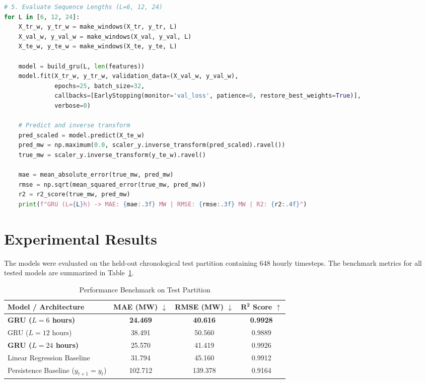\documentclass[12pt,a4paper]{article}
\begin{document}
\begin{lstlisting}[language=Python]
# 5. Evaluate Sequence Lengths (L=6, 12, 24)
for L in [6, 12, 24]:
    X_tr_w, y_tr_w = make_windows(X_tr, y_tr, L)
    X_val_w, y_val_w = make_windows(X_val, y_val, L)
    X_te_w, y_te_w = make_windows(X_te, y_te, L)
    
    model = build_gru(L, len(features))
    model.fit(X_tr_w, y_tr_w, validation_data=(X_val_w, y_val_w),
              epochs=25, batch_size=32,
              callbacks=[EarlyStopping(monitor='val_loss', patience=6, restore_best_weights=True)],
              verbose=0)
    
    # Predict and inverse transform
    pred_scaled = model.predict(X_te_w)
    pred_mw = np.maximum(0.0, scaler_y.inverse_transform(pred_scaled).ravel())
    true_mw = scaler_y.inverse_transform(y_te_w).ravel()
    
    mae = mean_absolute_error(true_mw, pred_mw)
    rmse = np.sqrt(mean_squared_error(true_mw, pred_mw))
    r2 = r2_score(true_mw, pred_mw)
    print(f"GRU (L={L}h) -> MAE: {mae:.3f} MW | RMSE: {rmse:.3f} MW | R2: {r2:.4f}")
\end{lstlisting}

\section*{Experimental Results}
The models were evaluated on the held-out chronological test partition containing 648 hourly timesteps. The benchmark metrics for all tested models are summarized in Table~\ref{tab:results}.

\begin{table}[H]
\centering
\caption{Performance Benchmark on Test Partition}
\label{tab:results}
\begin{tabular}{lccc}
\toprule
\textbf{Model / Architecture} & \textbf{MAE (MW)} $\downarrow$ & \textbf{RMSE (MW)} $\downarrow$ & $\mathbf{R^2}$ \textbf{Score} $\uparrow$ \\
\midrule
\textbf{GRU ($L=6$ hours)} & \textbf{24.469} & \textbf{40.616} & \textbf{0.9928} \\
GRU ($L=12$ hours) & 38.491 & 50.560 & 0.9889 \\
\textbf{GRU ($L=24$ hours)} & 25.570 & 41.419 & 0.9926 \\
\midrule
Linear Regression Baseline & 31.794 & 45.160 & 0.9912 \\
Persistence Baseline ($y_{t+1}=y_t$) & 102.712 & 139.378 & 0.9164 \\
\bottomrule
\end{tabular}
\end{table}
\end{document}
